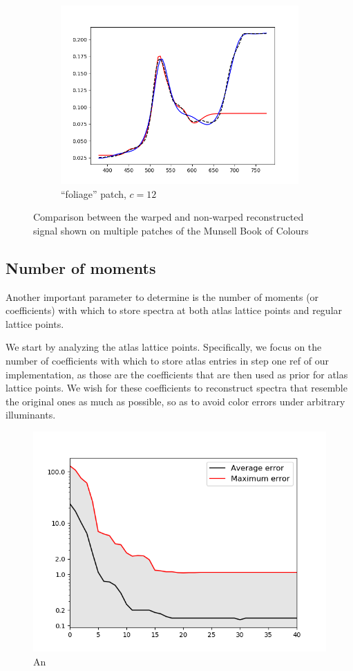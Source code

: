 \begin{figure}[t]
\begin{subfigure}[t]{0.45\textwidth}
		\includegraphics[width=\linewidth]{img/results_techniqueFoliage.png}
		\caption{``foliage'' patch, $c = 12$}
		\label{fig:resultsWarping_foliage}
	\end{subfigure}
	\caption{Comparison between the warped and non-warped reconstructed signal shown on multiple patches of the Munsell Book of Colours}
	\label{fig:resultsWarping}
\end{figure}

\subsection{Number of moments} \label{ssec:noOfMoments}

Another important parameter to determine is the number of moments (or coefficients) with which to store spectra at both atlas lattice points and regular lattice points.

We start by analyzing the atlas lattice points. Specifically, we focus on the number of coefficients with which to store atlas entries in step one ref of our implementation, as those are the coefficients that are then used as prior for atlas lattice points. We wish for these coefficients to reconstruct spectra that resemble the original ones as much as possible, so as to avoid color errors under arbitrary illuminants.

\begin{figure}[t!]
	\centering
	\includegraphics[width=0.6\linewidth]{img/results_noOfMoments_deltaE.png}
	\caption{An}
	\label{fig:results_noOfMoments_deltaE}
\end{figure}

